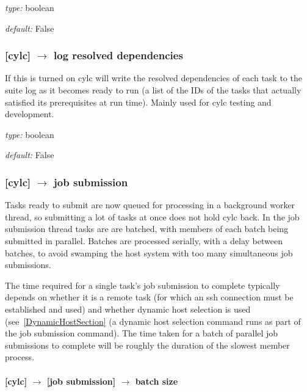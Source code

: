 \begin{myitemize}
    \item {\em type:} boolean
    \item {\em default:} False
\end{myitemize}

\subsubsection[log resolved dependencies]{[cylc] $\rightarrow$ log resolved dependencies}

If this is turned on cylc will write the resolved dependencies of each
task to the suite log as it becomes ready to run (a list of the IDs of
the tasks that actually satisfied its prerequisites at run time). Mainly
used for cylc testing and development.

\begin{myitemize}
    \item {\em type:} boolean
    \item {\em default:} False
\end{myitemize}

\subsubsection[job submission]{[cylc] $\rightarrow$ job submission}

Tasks ready to submit are now queued for processing in a background
worker thread, so submitting a lot of tasks at once does not hold cylc 
back.  In the job submission thread tasks are are batched, with members
of each batch being submitted in parallel. Batches are processed serially, 
with a delay between batches, to avoid swamping the host system with too
many simultaneous job submissions. 

The time required for a single task's job submission to complete
typically depends on whether it is a remote task (for which an ssh
connection must be established and used) and whether dynamic host
selection is used (see~\ref{DynamicHostSection} (a dynamic host
selection command runs as part of the job submission command). The time
taken for a batch of parallel job submissions to complete will be
roughly the duration of the slowest member process. 

\paragraph[batch size]{[cylc] $\rightarrow$ [job submission] $\rightarrow$ batch size}

